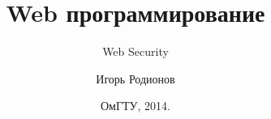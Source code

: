 \documentclass[10pt]{beamer}
\title[Web]{Web программирование}
\subtitle[Web Security]{Web Security}
\author[Родионов И.Н.]{Игорь Родионов}
\institute[ОмГТУ ИВТ]{Омский Государственный Технический Университет\\
	{\tiny кафедра Информатики и вычислительной техники}\\
}
\date[2014]{ОмГТУ, 2014.}
\begin{document}
\begin{frame}[plain]
\maketitle
\end{frame}















\end{document}
